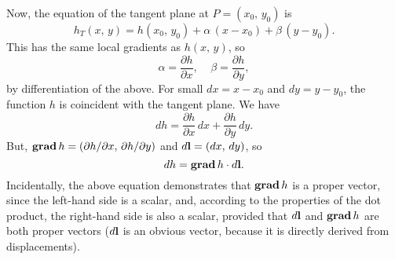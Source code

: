 Now, the equation of the tangent plane at $P=(x_0,\, y_0)$ is
\begin{equation}
h_T(x,\,y)= h(x_0,\,y_0) + \alpha\,(x-x_0)+\beta\,(y-y_0).
\end{equation}
This has the same local gradients as $h(x,\,y)$, so
\begin{equation}
\alpha = \frac{\partial h}{\partial x},~~~~~\beta= \frac{\partial h}{\partial y},
\end{equation}
by differentiation of the above.
For small $dx=x-x_0$ and $dy=y-y_0$, the function $h$ is coincident with the tangent
plane. We have
\begin{equation}
dh = \frac{\partial h}{\partial x}\, dx +\frac{\partial h}
{\partial y}\, dy.
\end{equation}
But, ${\bf grad}\,h = (\partial h/\partial x, \,\partial h/\partial y)$ and
$d{\bf l} = (dx, \,dy)$, so
\begin{equation}
dh = {\bf grad}\,h \cdot d{\bf l}.
\end{equation}
Incidentally, the above equation demonstrates that ${\bf grad}\,h$ is a proper vector,
since the left-hand side is a scalar, and, according to the properties of the dot
product, the right-hand side is also a scalar, provided that $d{\bf l}$ and
${\bf grad}\,h$ are both 
proper vectors ($d{\bf l}$ is an obvious vector, because it is
directly derived from displacements).

